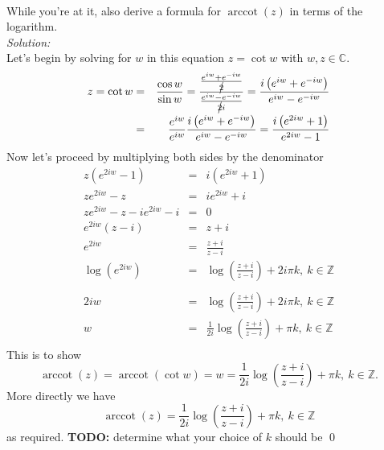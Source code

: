 \documentclass[10pt]{amsart}
\theoremstyle{nonumberplain}
\begin{document}
\begin{enumerate}[label={\bf {\arabic*}:}]
\\
While you're at it, also derive a formula for $\operatorname{arccot}(z)$ in terms of the logarithm. \\
\textit{Solution:} \\
Let's begin by solving for $w$ in this equation $z = \cot w$ with $w, z \in \mathbb{C}$.
\begin{eqnarray*}
z = \cot w &=& \frac{\cos w}{\sin w} = \frac{ \frac{e^{iw} + e^{-iw}}{\cancel{2}} }{ \frac{e^{iw} - e^{-iw}}{\cancel{2}i} } = \frac{ i\left(e^{iw} + e^{-iw} \right)}{ e^{iw} - e^{-iw} } \\
	  &=& \frac{e^{iw}}{e^{iw}} \frac{ i\left(e^{iw} + e^{-iw} \right)}{ e^{iw} - e^{-iw} } = \frac{ i\left(e^{2iw} + 1 \right)}{ e^{2iw} - 1 }
\end{eqnarray*}
Now let's proceed by multiplying both sides by the denominator
\begin{eqnarray*}
z(e^{2iw} - 1) &=& i\left(e^{2iw} + 1 \right) \\
ze^{2iw} - z &=& ie^{2iw} + i \\
ze^{2iw} - z - ie^{2iw} - i &=& 0 \\
e^{2iw}(z - i) &=& z + i \\ 
e^{2iw} &=& \frac{z + i}{z - i} \\
\log \left(e^{2iw}\right) &=& \log \left(\frac{z + i}{z - i} \right) + 2i\pi k, \: k \in \mathbb{Z} \\ \\
2iw &=& \log \left(\frac{z + i}{z - i} \right) + 2i\pi k, \: k \in \mathbb{Z} \\
w &=& \frac{1}{2i}\log \left(\frac{z + i}{z - i} \right) + \pi k, \: k \in \mathbb{Z} \\
\end{eqnarray*}
This is to show
$$\operatorname{arccot}(z) = \operatorname{arccot}(\cot w) = w = \frac{1}{2i}\log \left(\frac{z + i}{z - i} \right) + \pi k, \: k \in \mathbb{Z}.$$
More directly we have 
$$ \operatorname{arccot}(z) = \frac{1}{2i}\log \left(\frac{z + i}{z - i} \right) + \pi k, \: k \in \mathbb{Z}$$
as required. 
\textbf{TODO:} determine what your choice of $k$ should be \qed \\


\end{enumerate}
\end{document}
